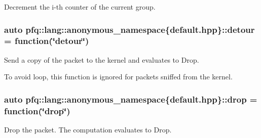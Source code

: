 Decrement the i-\/th counter of the current group. 

\subsubsection[{\texorpdfstring{detour}{detour}}]{\setlength{\rightskip}{0pt plus 5cm}auto pfq\+::lang\+::anonymous\+\_\+namespace\{default.\+hpp\}\+::detour = {\bf function}(\char`\"{}detour\char`\"{})}\hypertarget{namespacepfq_1_1lang_1_1anonymous__namespace_02default_8hpp_03_ac8ba4f5ff06c1e099ac888ba4faa697a}{}\label{namespacepfq_1_1lang_1_1anonymous__namespace_02default_8hpp_03_ac8ba4f5ff06c1e099ac888ba4faa697a}


Send a copy of the packet to the kernel and evaluates to {\ttfamily Drop}. 

To avoid loop, this function is ignored for packets sniffed from the kernel. 
\subsubsection[{\texorpdfstring{drop}{drop}}]{\setlength{\rightskip}{0pt plus 5cm}auto pfq\+::lang\+::anonymous\+\_\+namespace\{default.\+hpp\}\+::drop = {\bf function}(\char`\"{}drop\char`\"{})}\hypertarget{namespacepfq_1_1lang_1_1anonymous__namespace_02default_8hpp_03_a0d715988e000ac6284a1615091eb4067}{}\label{namespacepfq_1_1lang_1_1anonymous__namespace_02default_8hpp_03_a0d715988e000ac6284a1615091eb4067}


Drop the packet. The computation evaluates to {\ttfamily Drop}. 

